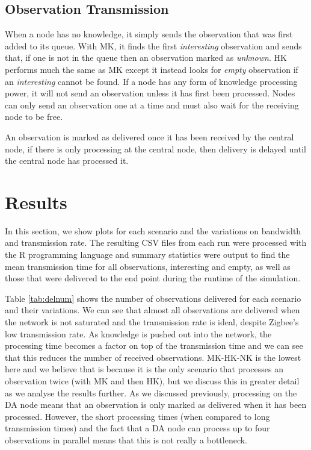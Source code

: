 \subsection{Observation Transmission}
When a node has no knowledge, it simply sends the observation that was first added to its queue. With MK, it finds the first \textit{interesting} observation and sends that, if one is not in the queue then an observation marked as \textit{unknown}. HK performs much the same as MK except it instead looks for \textit{empty} observation if an \textit{interesting} cannot be found. If a node has any form of knowledge processing power, it will not send an observation unless it has first been processed. Nodes can only send an observation one at a time and must also wait for the receiving node to be free.

An observation is marked as delivered once it has been received by the central node, if there is only processing at the central node, then delivery is delayed until the central node has processed it.


\section{Results}\label{sim:res}
In this section, we show plots for each scenario and the variations on bandwidth and transmission rate. The resulting CSV files from each run were processed with the R programming language \cite{rlang} and summary statistics were output to find the mean transmission time for all observations, interesting and empty, as well as those that were delivered to the end point during the runtime of the simulation.

 Table \ref{tab:delnum} shows the number of observations delivered for each scenario and their variations. We can see that almost all observations are delivered when the network is not saturated and the transmission rate is ideal, despite Zigbee's low transmission rate. As knowledge is pushed out into the network, the processing time becomes a factor on top of the transmission time and we can see that this reduces the number of received observations. MK-HK-NK is the lowest here and we believe that is because it is the only scenario that processes an observation twice (with MK and then HK), but we discuss this in greater detail as we analyse the results further. As we discussed previously, processing on the DA node means that an observation is only marked as delivered when it has been processed. However, the short processing times (when compared to long transmission times) and the fact that a DA node can process up to four observations in parallel means that this is not really a bottleneck.
 
